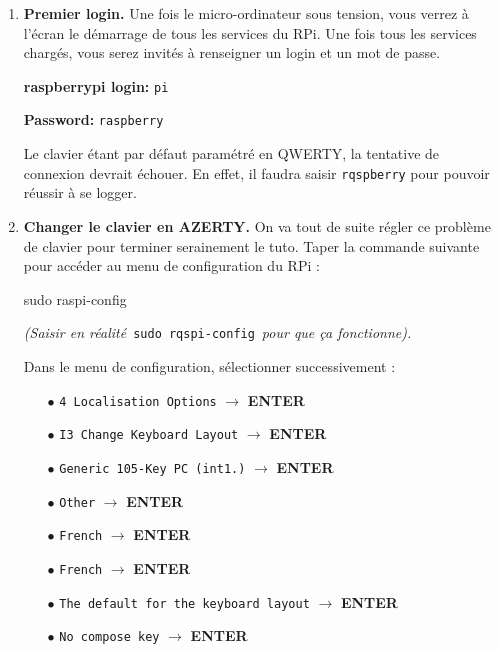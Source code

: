 \documentclass[a4paper, 10pt]{article}
\begin{document}
\begin{enumerate}
	\item\textbf{Premier login.} Une fois le micro-ordinateur sous tension, 
	vous verrez à l'écran le démarrage de tous les services du RPi. 
	Une fois tous les services chargés, vous serez invités à renseigner un 
	login et un mot de passe.
	
	\textbf{raspberrypi login:} \texttt{pi}

	\textbf{Password:} \texttt{raspberry}

	Le clavier étant par défaut paramétré en QWERTY, la tentative de connexion 
	devrait échouer. En effet, il faudra saisir \texttt{rqspberry} pour pouvoir 
	réussir à se logger.
	
	\item\textbf{Changer le clavier en AZERTY.} On va tout de suite régler 
	ce problème de clavier pour terminer serainement le tuto. 
	Taper la commande suivante pour accéder au menu de configuration du RPi :
	
\begin{commandshell}
sudo raspi-config
\end{commandshell}
	
	\textit{(Saisir en réalité}\
	\texttt{sudo rqspi-config}\
	\textit{pour que ça fonctionne).}
	
	Dans le menu de configuration, sélectionner successivement :

	\begin{itemize}
		\item[$\bullet$] \texttt{4 Localisation Options} 
						 $\rightarrow$ \textbf{ENTER}
		\item[$\bullet$] \texttt{I3 Change Keyboard Layout}
						 $\rightarrow$ \textbf{ENTER}
		\item[$\bullet$] \texttt{Generic 105-Key PC (int1.)}
						 $\rightarrow$ \textbf{ENTER}
		\item[$\bullet$] \texttt{Other}
						 $\rightarrow$ \textbf{ENTER}
		\item[$\bullet$] \texttt{French}
						 $\rightarrow$ \textbf{ENTER}	
		\item[$\bullet$] \texttt{French}
						 $\rightarrow$ \textbf{ENTER}	
		\item[$\bullet$] \texttt{The default for the keyboard layout}
						 $\rightarrow$ \textbf{ENTER}	
		\item[$\bullet$] \texttt{No compose key}
						 $\rightarrow$ \textbf{ENTER}			 		
	\end{itemize}
	

\end{enumerate}
\end{document}
